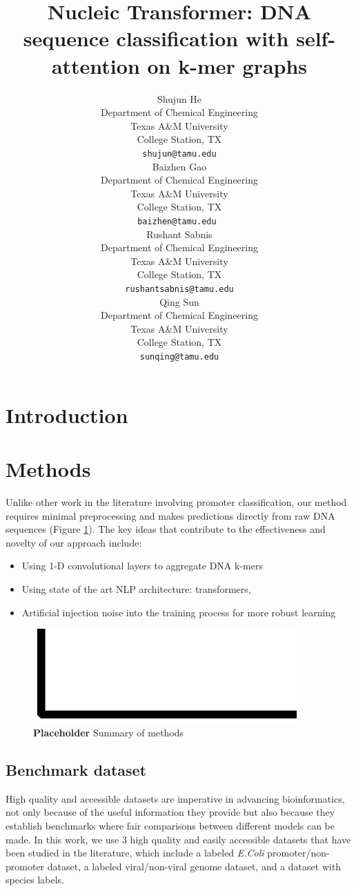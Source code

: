 \documentclass{article}
\title{\textbf{Nucleic Transformer: DNA sequence classification with self-attention on k-mer graphs}}
\author{
  Shujun He \\
  Department of Chemical Engineering\\
  Texas A\&M University\\
  College Station, TX\\
  \texttt{shujun@tamu.edu} \\
    \And
  Baizhen Gao \\
  Department of Chemical Engineering\\
  Texas A\&M University\\
  College Station, TX\\
  \texttt{baizhen@tamu.edu } \\ 

    \And
  Rushant Sabnis \\
  Department of Chemical Engineering\\
  Texas A\&M University\\
  College Station, TX\\
  \texttt{rushantsabnis@tamu.edu} \\   

   \And
  Qing Sun \\
  Department of Chemical Engineering\\
  Texas A\&M University\\
  College Station, TX\\
  \texttt{sunqing@tamu.edu} \\
}
\begin{document}
\maketitle
\begin{abstract}

\end{abstract}




\section{Introduction}

\section{Methods}
Unlike other work in the literature involving promoter classification, our method requires minimal preprocessing and makes predictions directly from raw DNA sequences (Figure \ref{fig:network_architecture}). The key ideas that contribute to the effectiveness and novelty of our approach include:
\begin{itemize}
\itemsep0em 
\item Using 1-D convolutional layers to aggregate DNA k-mers 
\item Using state of the art NLP architecture: transformers, 
\item Artificial injection noise into the training process for more robust learning
\end{itemize}

\begin{figure}[H]
\center
\includegraphics[width=0.9\textwidth]{network_architecture}
\caption{\textbf{Placeholder} Summary of methods}
\label{fig:network_architecture}
\end{figure}

\subsection{Benchmark dataset}
High quality and accessible datasets are imperative in advancing bioinformatics, not only because of the useful information they provide but also because they establish benchmarks where fair comparisons between different models can be made. In this work, we use 3 high quality and easily accessible datasets that have been studied in the literature, which include a labeled \textit{E.Coli} promoter/non-promoter dataset, a labeled viral/non-viral genome dataset, and a dataset with species labels. 
\end{document}
